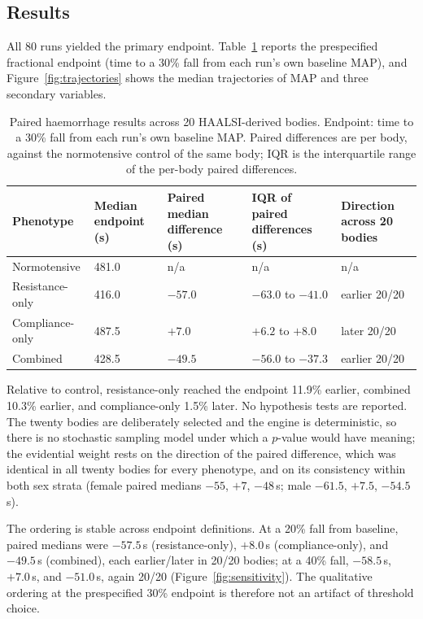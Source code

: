 \documentclass[preprint,12pt,nopreprintline]{elsarticle}
\begin{document}
\subsection{Results}
\label{sec:haem-results}

All 80 runs yielded the primary endpoint. Table~\ref{tab:results} reports the prespecified fractional endpoint (time to a 30\% fall from each run's own baseline MAP), and Figure~\ref{fig:trajectories} shows the median trajectories of MAP and three secondary variables.

\begin{table}[t]
\centering
\caption{Paired haemorrhage results across 20 HAALSI-derived bodies. Endpoint: time to a 30\% fall from each run's own baseline MAP. Paired differences are per body, against the normotensive control of the same body; IQR is the interquartile range of the per-body paired differences.}
\label{tab:results}
\begin{tabularx}{\textwidth}{lp{2.2cm}p{2.8cm}Xp{2.6cm}}
\toprule
Phenotype & Median endpoint (s) & Paired median difference (s) & IQR of paired differences (s) & Direction across 20 bodies \\
\midrule
Normotensive & 481.0 & n/a & n/a & n/a \\
Resistance-only & 416.0 & $-57.0$ & $-63.0$ to $-41.0$ & earlier 20/20 \\
Compliance-only & 487.5 & $+7.0$ & $+6.2$ to $+8.0$ & later 20/20 \\
Combined & 428.5 & $-49.5$ & $-56.0$ to $-37.3$ & earlier 20/20 \\
\bottomrule
\end{tabularx}
\end{table}

Relative to control, resistance-only reached the endpoint 11.9\% earlier, combined 10.3\% earlier, and compliance-only 1.5\% later. No hypothesis tests are reported. The twenty bodies are deliberately selected and the engine is deterministic, so there is no stochastic sampling model under which a $p$-value would have meaning; the evidential weight rests on the direction of the paired difference, which was identical in all twenty bodies for every phenotype, and on its consistency within both sex strata (female paired medians $-55$, $+7$, $-48$\,s; male $-61.5$, $+7.5$, $-54.5$\,s).

The ordering is stable across endpoint definitions. At a 20\% fall from baseline, paired medians were $-57.5$\,s (resistance-only), $+8.0$\,s (compliance-only), and $-49.5$\,s (combined), each earlier/later in 20/20 bodies; at a 40\% fall, $-58.5$\,s, $+7.0$\,s, and $-51.0$\,s, again 20/20 (Figure~\ref{fig:sensitivity}). The qualitative ordering at the prespecified 30\% endpoint is therefore not an artifact of threshold choice.
\end{document}
